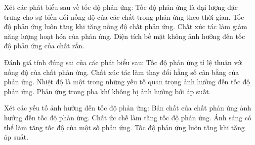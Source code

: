 \documentclass[Main.tex]{subfiles}
\begin{document}
\begin{ex}
	Xét các phát biểu sau về tốc độ phản ứng:
	\choiceTF
	{\True Tốc độ phản ứng là đại lượng đặc trưng cho sự biến đổi nồng độ của các chất trong phản ứng theo thời gian.}
	{Tốc độ phản ứng luôn tăng khi tăng nồng độ chất phản ứng.}
	{\True Chất xúc tác làm giảm năng lượng hoạt hóa của phản ứng.}
	{Diện tích bề mặt không ảnh hưởng đến tốc độ phản ứng của chất rắn.}
\end{ex}
\begin{ex}
	Đánh giá tính đúng sai của các phát biểu sau:
	\choiceTF
	{\True Tốc độ phản ứng tỉ lệ thuận với nồng độ của chất phản ứng.}
	{Chất xúc tác làm thay đổi hằng số cân bằng của phản ứng.}
	{\True Nhiệt độ là một trong những yếu tố quan trọng ảnh hưởng đến tốc độ phản ứng.}
	{Phản ứng trong pha khí không bị ảnh hưởng bởi áp suất.}
\end{ex}
\begin{ex}
	Xét các yếu tố ảnh hưởng đến tốc độ phản ứng:
	\choiceTF
	{\True Bản chất của chất phản ứng ảnh hưởng đến tốc độ phản ứng.}
	{Chất ức chế làm tăng tốc độ phản ứng.}
	{\True Ánh sáng có thể làm tăng tốc độ của một số phản ứng.}
	{Tốc độ phản ứng luôn tăng khi tăng áp suất.}
\end{ex}
\end{document}
